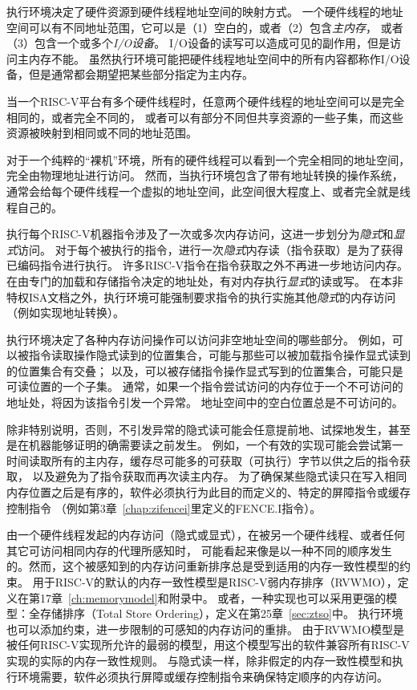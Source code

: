 执行环境决定了硬件资源到硬件线程地址空间的映射方式。
一个硬件线程的地址空间可以有不同地址范围，它可以是（1）空白的，或者（2）包含{\em 主内存}，
或者（3）包含一个或多个{\em I/O设备}。
I/O设备的读写可以造成可见的副作用，但是访问主内存不能。
虽然执行环境可能把硬件线程地址空间中的所有内容都称作I/O设备，但是通常都会期望把某些部分指定为主内存。

当一个RISC-V平台有多个硬件线程时，任意两个硬件线程的地址空间可以是完全相同的，或者完全不同的，
或者可以有部分不同但共享资源的一些子集，而这些资源被映射到相同或不同的地址范围。

\begin{commentary}
  对于一个纯粹的“裸机”环境，所有的硬件线程可以看到一个完全相同的地址空间，完全由物理地址进行访问。
  然而，当执行环境包含了带有地址转换的操作系统，通常会给每个硬件线程一个虚拟的地址空间，此空间很大程度上、或者完全就是线程自己的。
\end{commentary}

执行每个RISC-V机器指令涉及了一次或多次内存访问，这进一步划分为{\em 隐式}和{\em 显式}访问。
对于每个被执行的指令，进行一次{\em 隐式}内存读（指令获取）是为了获得已编码指令进行执行。
许多RISC-V指令在指令获取之外不再进一步地访问内存。在由专门的加载和存储指令决定的地址处，有对内存执行{\em 显式}的读或写。
在本非特权ISA文档之外，执行环境可能强制要求指令的执行实施其他{\em 隐式}的内存访问（例如实现地址转换）。

执行环境决定了各种内存访问操作可以访问非空地址空间的哪些部分。
例如，可以被指令读取操作隐式读到的位置集合，可能与那些可以被加载指令操作显式读到的位置集合有交叠；
以及，可以被存储指令操作显式写到的位置集合，可能只是可读位置的一个子集。
通常，如果一个指令尝试访问的内存位于一个不可访问的地址处，将因为该指令引发一个异常。
地址空间中的空白位置总是不可访问的。

除非特别说明，否则，不引发异常的隐式读可能会任意提前地、试探地发生，甚至是在机器能够证明的确需要读之前发生。
例如，一个有效的实现可能会尝试第一时间读取所有的主内存，缓存尽可能多的可获取（可执行）字节以供之后的指令获取，
以及避免为了指令获取而再次读主内存。
为了确保某些隐式读只在写入相同内存位置之后是有序的，软件必须执行为此目的而定义的、特定的屏障指令或缓存控制指令
（例如第3章~\ref{chap:zifencei}里定义的FENCE.I指令）。

由一个硬件线程发起的内存访问（隐式或显式），在被另一个硬件线程、或者任何其它可访问相同内存的代理所感知时，
可能看起来像是以一种不同的顺序发生的。然而，这个被感知到的内存访问重新排序总是受到适用的内存一致性模型的约束。
用于RISC-V的默认的内存一致性模型是RISC-V弱内存排序（RVWMO），定义在第17章~\ref{ch:memorymodel}和附录中。
或者，一种实现也可以采用更强的模型：全存储排序（Total Store Ordering），定义在第25章~\ref{sec:ztso}中。
执行环境也可以添加约束，进一步限制的可感知的内存访问的重排。
由于RVWMO模型是被任何RISC-V实现所允许的最弱的模型，用这个模型写出的软件兼容所有RISC-V实现的实际的内存一致性规则。
与隐式读一样，除非假定的内存一致性模型和执行环境需要，软件必须执行屏障或缓存控制指令来确保特定顺序的内存访问。

